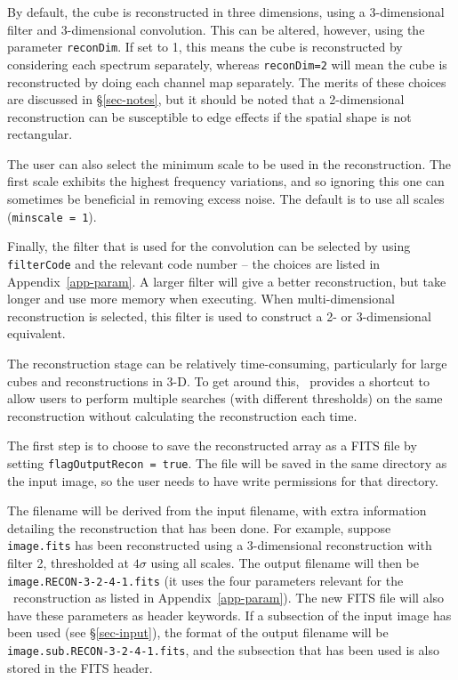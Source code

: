 By default, the cube is reconstructed in three dimensions, using a
3-dimensional filter and 3-dimensional convolution. This can be
altered, however, using the parameter \texttt{reconDim}. If set to 1,
this means the cube is reconstructed by considering each spectrum
separately, whereas \texttt{reconDim=2} will mean the cube is
reconstructed by doing each channel map separately. The merits of
these choices are discussed in \S\ref{sec-notes}, but it should be
noted that a 2-dimensional reconstruction can be susceptible to edge
effects if the spatial shape is not rectangular.

The user can also select the minimum scale to be used in the
reconstruction. The first scale exhibits the highest frequency
variations, and so ignoring this one can sometimes be beneficial in
removing excess noise. The default is to use all scales
(\texttt{minscale = 1}).

Finally, the filter that is used for the convolution can be selected
by using \texttt{filterCode} and the relevant code number -- the
choices are listed in Appendix~\ref{app-param}. A larger filter will
give a better reconstruction, but take longer and use more memory when
executing. When multi-dimensional reconstruction is selected, this
filter is used to construct a 2- or 3-dimensional equivalent.

\label{sec-reconIO}

The reconstruction stage can be relatively time-consuming,
particularly for large cubes and reconstructions in 3-D. To get around
this, \duchamp\ provides a shortcut to allow users to perform multiple
searches (\eg with different thresholds) on the same reconstruction
without calculating the reconstruction each time.

The first step is to choose to save the reconstructed array as a FITS
file by setting \texttt{flagOutputRecon = true}. The file will be
saved in the same directory as the input image, so the user needs to
have write permissions for that directory.

The filename will be derived from the input filename, with extra
information detailing the reconstruction that has been done. For
example, suppose \texttt{image.fits} has been reconstructed using a
3-dimensional reconstruction with filter 2, thresholded at $4\sigma$
using all scales. The output filename will then be
\texttt{image.RECON-3-2-4-1.fits} (\ie it uses the four parameters
relevant for the \atrous\ reconstruction as listed in
Appendix~\ref{app-param}). The new FITS file will also have these
parameters as header keywords. If a subsection of the input image has
been used (see \S\ref{sec-input}), the format of the output filename
will be \texttt{image.sub.RECON-3-2-4-1.fits}, and the subsection that
has been used is also stored in the FITS header.


